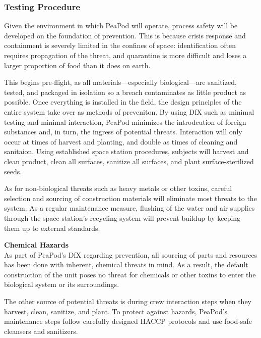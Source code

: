 \subsubsection{Testing Procedure}

Given the environment in which PeaPod will operate, process safety will be developed on the foundation of prevention. This is because crisis response and containment is severely limited in the confines of space: identification often requires propagation of the threat, and quarantine is more difficult and loses a larger proportion of food than it does on earth.

This begins pre-flight, as all materials---especially biological---are sanitized, tested, and packaged in isolation so a breach contaminates as little product as possible. Once everything is installed in the field, the design principles of the entire system take over as methods of preveniton. By using DfX such as minimal testing and minimal interaction, PeaPod minimizes the introdcution of foreign substances and, in turn, the ingress of potential threats. Interaction will only occur at times of harvest and planting, and double as times of cleaning and sanitaion. Using established space station procedures, subjects will harvest and clean product, clean all surfaces, sanitize all surfaces, and plant surface-sterilized seeds.

As for non-biological threats such as heavy metals or other toxins, careful selection and sourcing of construction materials will eliminate most threats to the system. As a regular maintenance measure, flushing of the water and air supplies through the space station's recycling system will prevent buildup by keeping them up to external standards.

\textbf{Chemical Hazards}\\
As part of PeaPod's DfX regarding prevention, all sourcing of parts and resources has been done with inherent, chemical threats in mind. As a result, the default construction of the unit poses no threat for chemicals or other toxins to enter the biological system or its surroundings.

The other source of potential threats is during crew interaction steps when they harvest, clean, sanitize, and plant. To protect against hazards, PeaPod's maintenance steps follow carefully designed HACCP protocols and use food-safe cleansers and sanitizers.


